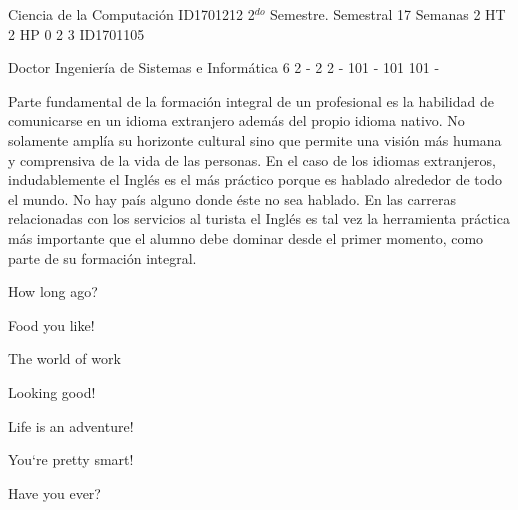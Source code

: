 \documentclass[a4paper,8pt]{article}
\begin{document}
\setNombreProfesor{}
\setGradoProfesorAbreviado{}
\sylabusHeader

\academicaTable
{Ciencia de la Computación} %
{ID1701212} %
{2$^{do}$ Semestre.} %
{Semestral} %
{17 Semanas} %
{2 HT} %
{2 HP} %
{0} %
{}  %
{2} %
{3} %
{ID1701105} %

\administrativaTable
{Doctor} %
{Ingeniería de Sistemas e Informática} %
{6} %
{2} %
{-} %
{2} %
{2} %
{-} %
{101} %
{-} %
{101} %
{101} %
{-} %


\begin{fundamentacion}
Parte fundamental de la formación integral de un profesional es la habilidad de 
comunicarse en un idioma extranjero además del propio idioma nativo. No solamente 
amplía su horizonte cultural sino que permite una visión más humana y comprensiva 
de la vida de las personas. En el caso de los idiomas extranjeros, indudablemente 
el Inglés es el más práctico porque es hablado alrededor de todo el mundo. No hay 
país alguno donde éste no sea hablado. En las carreras relacionadas con los 
servicios al turista el Inglés es tal vez la herramienta práctica más importante 
que el alumno debe dominar desde el primer momento, como parte de su formación 
integral.

\end{fundamentacion}

\begin{sumilla}
\item How long ago?
\item Food you like!
\item The world of work
\item Looking good!
\item Life is an adventure!
\item You`re pretty smart!
\item Have you ever?

\end{sumilla}
\end{document}
